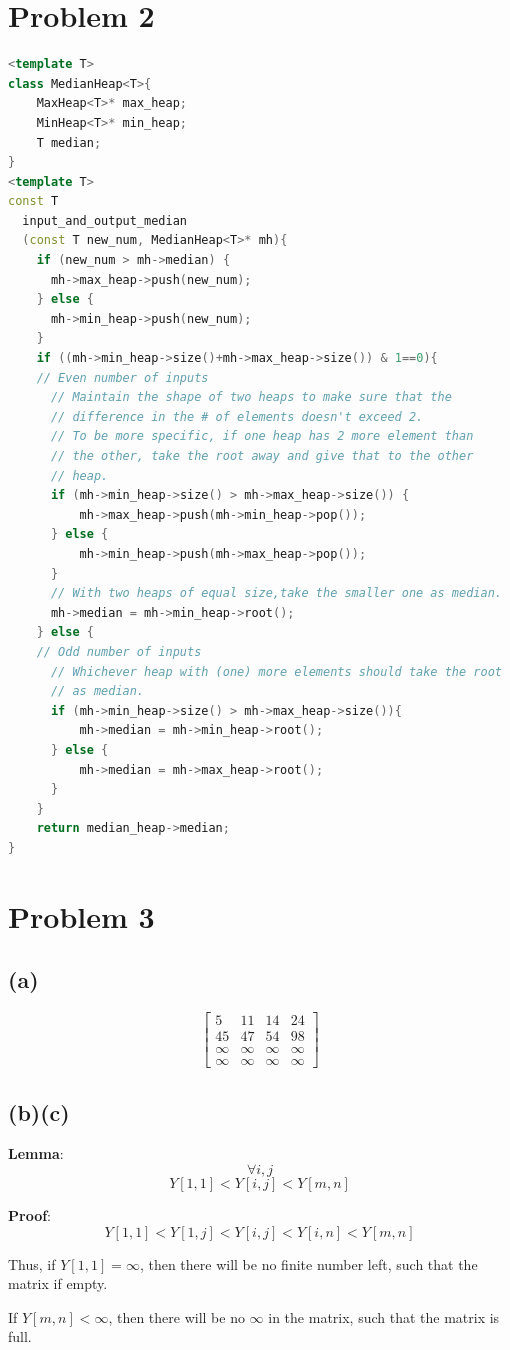 \documentclass{article}
\begin{document}
\section*{Problem 2}
\begin{lstlisting}[language = C++]
<template T>
class MedianHeap<T>{
    MaxHeap<T>* max_heap;
    MinHeap<T>* min_heap;
    T median;
}
<template T> 
const T 
  input_and_output_median
  (const T new_num, MedianHeap<T>* mh){
    if (new_num > mh->median) {
      mh->max_heap->push(new_num);
    } else {
      mh->min_heap->push(new_num);
    }
    if ((mh->min_heap->size()+mh->max_heap->size()) & 1==0){
    // Even number of inputs
      // Maintain the shape of two heaps to make sure that the 
      // difference in the # of elements doesn't exceed 2.
      // To be more specific, if one heap has 2 more element than 
      // the other, take the root away and give that to the other 
      // heap.
      if (mh->min_heap->size() > mh->max_heap->size()) {
          mh->max_heap->push(mh->min_heap->pop());
      } else {
          mh->min_heap->push(mh->max_heap->pop());
      }
      // With two heaps of equal size,take the smaller one as median.
      mh->median = mh->min_heap->root();
    } else {
    // Odd number of inputs
      // Whichever heap with (one) more elements should take the root 
      // as median.
      if (mh->min_heap->size() > mh->max_heap->size()){
          mh->median = mh->min_heap->root();
      } else {
          mh->median = mh->max_heap->root();
      }
    }
    return median_heap->median;
}
\end{lstlisting}
\section*{Problem 3}
  \subsection*{(a)}
    $$\begin{bmatrix}
       5 & 11 & 14 & 24 \\
      45 & 47 & 54 & 98 \\
      \infty & \infty & \infty & \infty \\
      \infty & \infty & \infty & \infty 
    \end{bmatrix}$$
  \subsection*{(b)(c)}
    \par \textbf{Lemma}: $$\forall i, j$$$$ Y[1, 1] < Y[i, j] < Y[m, n]$$
    \par \textbf{Proof}: 
      $$Y[1, 1] < Y[1, j] < Y[i, j] < Y[i, n] < Y[m, n]$$
    \par Thus, if $Y[1,1] = \infty$, then there will be no finite number left, such that the matrix if empty.
    \par If $Y[m, n] < \infty$, then there will be no $\infty$ in the matrix, such that the matrix is full.
\end{document}
